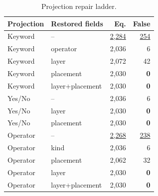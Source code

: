 \begin{table}[t]
\centering
\caption{Projection repair ladder.}
\label{tab:projection-ladder}
\footnotesize
\setlength{\tabcolsep}{3.2pt}
\begin{tabular}{llrr}
\toprule
Projection & Restored fields & Eq. & False \\
\midrule
Keyword & -- & \underline{2,284} & \underline{254} \\
Keyword & operator & 2,036 & 6 \\
Keyword & layer & 2,072 & 42 \\
Keyword & placement & 2,030 & \textbf{0} \\
Keyword & layer+placement & 2,030 & \textbf{0} \\
Yes/No & -- & 2,036 & 6 \\
Yes/No & layer & 2,030 & \textbf{0} \\
Yes/No & placement & 2,030 & \textbf{0} \\
Operator & -- & \underline{2,268} & \underline{238} \\
Operator & kind & 2,036 & 6 \\
Operator & placement & 2,062 & 32 \\
Operator & layer & 2,030 & \textbf{0} \\
Operator & layer+placement & 2,030 & \textbf{0} \\
\bottomrule
\end{tabular}
\end{table}

